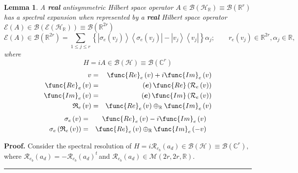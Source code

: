 \documentclass[aps,preprint]{revtex4}
\newtheorem{lemma}[theorem]{Lemma}
\newenvironment{proof}[1][Proof]{\noindent\textbf{#1.} }{\ \rule{0.5em}{0.5em}}
\begin{document}
\begin{lemma}
\label{1/16/2026}A \textbf{real} antisymmetric Hilbert space operator $A\in 
\mathcal{B}\left( \mathcal{H}_{\mathbb{R}}\right) \equiv \mathcal{B}\left( 
\mathbb{R}^{r}\right) $ has a spectral expansion when represented by a 
\textbf{real}  Hilbert space operator $\mathcal{E}\left( A\right) \in 
\mathcal{B}\left( \mathcal{E}\left( \mathcal{H}_{\mathbb{R}}\right) \right)
\equiv \mathcal{B}\left( \mathbb{R}^{2r}\right) $  
\begin{equation}
\mathcal{E}\left( A\right) \in \mathcal{B}\left( \mathbb{R}^{2r}\right)
=\sum_{1\leq j\leq r}\left\{ \left\vert \sigma _{e}\left( v_{j}\right)
\right\rangle \left\langle \sigma _{e}\left( v_{j}\right) \right\vert
-\left\vert v_{j}\right\rangle \left\langle v_{j}\right\vert \right\} \alpha
_{j};\qquad r_{e}\left( v_{j}\right) \in \mathbb{R}^{2r},\alpha _{j}\in 
\mathbb{R},
\end{equation}%
where 
\begin{equation}
H=iA\in \mathcal{B}\left( \mathcal{H}\right) \equiv \mathcal{B}\left( 
\mathbb{C}^{r}\right) 
\end{equation}%
\begin{eqnarray}
v &=&\func{Re}_{e}\left( v\right) +i\func{Im}_{e}\left( v\right)  \\
\func{Re}_{e}\left( v\right)  &=&\left( \boldsymbol{e}\right) \func{Re}%
\left( \mathcal{R}_{e}\left( v\right) \right)  \\
\func{Im}_{e}\left( v\right)  &=&\left( \boldsymbol{e}\right) \func{Im}%
\left( \mathcal{R}_{e}\left( v\right) \right)  \\
\mathfrak{R}_{e}\left( v\right)  &=&\func{Re}_{e}\left( v\right) \oplus _{%
\mathbb{R}}\func{Im}_{e}\left( v\right) 
\end{eqnarray}%
\begin{eqnarray}
\sigma _{e}\left( v\right)  &=&\func{Re}_{e}\left( v\right) -i\func{Im}%
_{e}\left( v\right)  \\
\sigma _{e}\left( \mathfrak{R}_{e}\left( v\right) \right)  &=&\func{Re}%
_{e}\left( v\right) \oplus _{\mathbb{R}}\func{Im}_{e}\left( -v\right) 
\end{eqnarray}
\end{lemma}

\begin{proof}
Consider the spectral resolution of $H=i\mathcal{R}_{e_{b}}\left(
a_{d}\right) \in \mathcal{B}\left( \mathcal{H}\right) \equiv \mathcal{B}%
\left( \mathbb{C}^{r}\right) ,\,$where $\mathcal{R}_{e_{b}}\left(
a_{d}\right) =-\mathcal{R}_{e_{b}}\left( a_{d}\right) ^{t}\,$and $\mathcal{R}%
_{e_{b}}\left( a_{d}\right) \in \mathcal{M}\left( 2r,2r,\mathbb{R}\right) .$
\end{proof}
\end{document}
